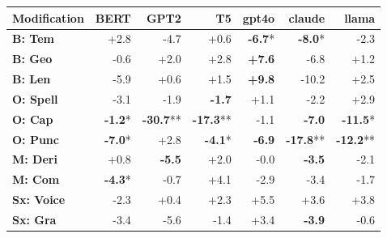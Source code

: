 \begin{table}[h]
\centering
\begin{tabular}{lrrrrrr}
\hline
Modification & \textbf{BERT} & \textbf{GPT2} & \textbf{T5} & \textbf{gpt4o} & \textbf{claude} & \textbf{llama} \\
\hline
\textbf{B: Tem} & \cellcolor{green!8} +2.8 & \cellcolor{red!14} -4.7 & \cellcolor{green!1} +0.6 & \cellcolor{red!20} \textbf{-6.7}* & \cellcolor{red!24} \textbf{-8.0}* & \cellcolor{red!6} -2.3 \\
\textbf{B: Geo} & \cellcolor{red!1} -0.6 & \cellcolor{green!5} +2.0 & \cellcolor{green!8} +2.8 & \cellcolor{green!22} \textbf{+7.6} & \cellcolor{red!20} -6.8 & \cellcolor{green!3} +1.2 \\
\textbf{B: Len} & \cellcolor{red!17} -5.9 & \cellcolor{green!1} +0.6 & \cellcolor{green!4} +1.5 & \cellcolor{green!29} \textbf{+9.8} & \cellcolor{red!30} -10.2 & \cellcolor{green!7} +2.5 \\
\hline
\textbf{O: Spell} & \cellcolor{red!9} -3.1 & \cellcolor{red!5} -1.9 & \cellcolor{red!5} \textbf{-1.7} & \cellcolor{green!3} +1.1 & \cellcolor{red!6} -2.2 & \cellcolor{green!8} +2.9 \\
\textbf{O: Cap} & \cellcolor{red!3} \textbf{-1.2}* & \cellcolor{red!30} \textbf{-30.7}** & \cellcolor{red!30} \textbf{-17.3}** & \cellcolor{red!3} -1.1 & \cellcolor{red!20} \textbf{-7.0} & \cellcolor{red!30} \textbf{-11.5}* \\
\textbf{O: Punc} & \cellcolor{red!21} \textbf{-7.0}* & \cellcolor{green!8} +2.8 & \cellcolor{red!12} \textbf{-4.1}* & \cellcolor{red!20} \textbf{-6.9} & \cellcolor{red!30} \textbf{-17.8}** & \cellcolor{red!30} \textbf{-12.2}** \\
\hline
\textbf{M: Deri} & \cellcolor{green!2} +0.8 & \cellcolor{red!16} \textbf{-5.5} & \cellcolor{green!6} +2.0 & \cellcolor{red!0} -0.0 & \cellcolor{red!10} \textbf{-3.5} & \cellcolor{red!6} -2.1 \\
\textbf{M: Com} & \cellcolor{red!12} \textbf{-4.3}* & \cellcolor{red!1} -0.7 & \cellcolor{green!12} +4.1 & \cellcolor{red!8} -2.9 & \cellcolor{red!10} -3.4 & \cellcolor{red!5} -1.7 \\
\hline
\textbf{Sx: Voice} & \cellcolor{red!7} -2.3 & \cellcolor{green!1} +0.4 & \cellcolor{green!6} +2.3 & \cellcolor{green!16} +5.5 & \cellcolor{green!10} +3.6 & \cellcolor{green!11} +3.8 \\
\textbf{Sx: Gra} & \cellcolor{red!10} -3.4 & \cellcolor{red!16} -5.6 & \cellcolor{red!4} -1.4 & \cellcolor{green!10} +3.4 & \cellcolor{red!11} \textbf{-3.9} & \cellcolor{red!1} -0.6 \\

\end{tabular}
\end{table}
